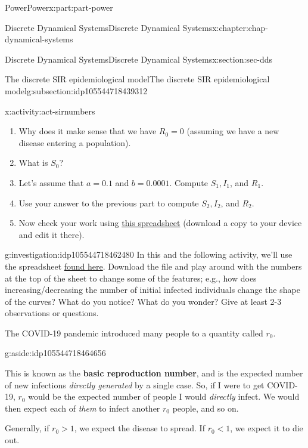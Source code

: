 \documentclass[oneside,10pt,]{book}
\newcommand{\terminology}[1]{\textbf{#1}}
\numberwithin{equation}{section}
\newcommand{\lt}{<}
\newcommand{\gt}{>}
\begin{document}
\begin{partptx}{Power}{}{Power}{}{}{x:part:part-power}
\begin{chapterptx}{Discrete Dynamical Systems}{}{Discrete Dynamical Systems}{}{}{x:chapter:chap-dynamical-systems}
\begin{sectionptx}{Discrete Dynamical Systems}{}{Discrete Dynamical Systems}{}{}{x:section:sec-dds}
\begin{subsectionptx}{The discrete SIR epidemiological model}{}{The discrete SIR epidemiological model}{}{}{g:subsection:idp105544718439312}
\begin{activity}{}{x:activity:act-sirnumbers}
%
\begin{enumerate}
\item{}Why does it make sense that we have \(R_0 = 0\) (assuming we have a new disease entering a population).%
\item{}What is \(S_0\)?%
\item{}Let's assume that \(a = 0.1\) and \(b = 0.0001\). Compute \(S_1, I_1\), and \(R_1\).%
\item{}Use your answer to the previous part to compute \(S_2, I_2\), and \(R_2\).%
\item{}Now check your work using \href{https://docs.google.com/spreadsheets/d/153LO2O21_TwEYyODq2Km90oRrilLEpfYmgb8w3AJSQo/edit?usp=sharing}{this spreadsheet}\footnotemark{} (download a copy to your device and edit it there).%
\end{enumerate}
\end{activity}%
%
\begin{investigation}{}{g:investigation:idp105544718462480}%
In this and the following activity, we'll use the spreadsheet \href{https://docs.google.com/spreadsheets/d/153LO2O21_TwEYyODq2Km90oRrilLEpfYmgb8w3AJSQo/edit?usp=sharing}{found here}\footnotemark{}. Download the file and play around with the numbers at the top of the sheet to change some of the features; e.g., how does increasing\slash{}decreasing the number of initial infected individuals change the shape of the curves? What do you notice? What do you wonder? Give at least 2-3 observations or questions.%
\end{investigation}%
%
The COVID-19 pandemic introduced many people to a quantity called \(r_0\). \begin{aside}{}{g:aside:idp105544718464656}%
\end{aside}
 This is known as the \terminology{basic reproduction number}, and is the expected number of new infections \emph{directly generated} by a single case. So, if I were to get COVID-19, \(r_0\) would be the expected number of people I would \emph{directly} infect. We would then expect each of \emph{them} to infect another \(r_0\) people, and so on.%
\par
Generally, if \(r_0 \gt 1\), we expect the disease to spread. If \(r_0 \lt 1\), we expect it to die out.%

\end{subsectionptx}
\end{sectionptx}
\end{chapterptx}
\end{partptx}
\end{document}
